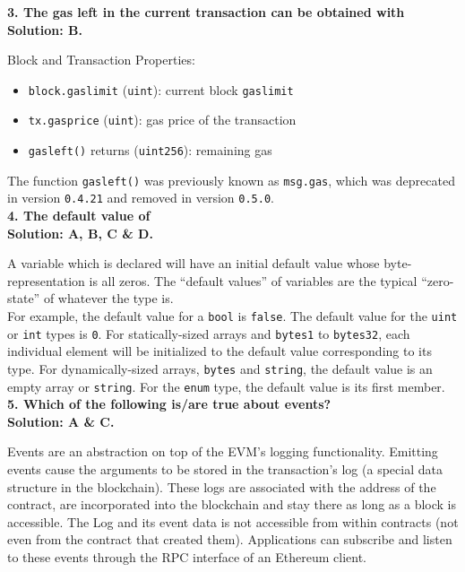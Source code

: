 \textbf{3. The gas left in the current transaction can be obtained with}\label{sec:exam2_q3}\\

\textbf{Solution: B.}

Block and Transaction Properties:

\begin{itemize}
    \item\verb|block.gaslimit| (\verb|uint|): current block \verb|gaslimit|
    \item\verb|tx.gasprice| (\verb|uint|): gas price of the transaction
    \item\verb|gasleft()| returns (\verb|uint256|): remaining gas
\end{itemize}

The function \verb|gasleft()| was previously known as \verb|msg.gas|, which was deprecated in version \verb|0.4.21| and removed in version \verb|0.5.0|.\\

\textbf{4. The default value of}\label{sec:exam2_q4}\\

\textbf{Solution: A, B, C \& D.}

A variable which is declared will have an initial default value whose byte-representation is all zeros.
The ``default values'' of variables are the typical ``zero-state'' of whatever the type is.\\

For example, the default value for a \verb|bool| is \verb|false|.
The default value for the \verb|uint| or \verb|int| types is \verb|0|.
For statically-sized arrays and \verb|bytes1| to \verb|bytes32|, each individual element will be initialized to the default value corresponding to its type.
For dynamically-sized arrays, \verb|bytes| and \verb|string|, the default value is an empty array or \verb|string|.
For the \verb|enum| type, the default value is its first member.\\

\textbf{5. Which of the following is/are true about events?}\label{sec:exam2_q5}\\

\textbf{Solution: A \& C.}

Events are an abstraction on top of the EVM's logging functionality.
Emitting events cause the arguments to be stored in the transaction's log (a special data structure in the blockchain).
These logs are associated with the address of the contract, are incorporated into the blockchain and stay there as long as a block is accessible.
The Log and its event data is not accessible from within contracts (not even from the contract that created them).
Applications can subscribe and listen to these events through the RPC interface of an Ethereum client.\\

